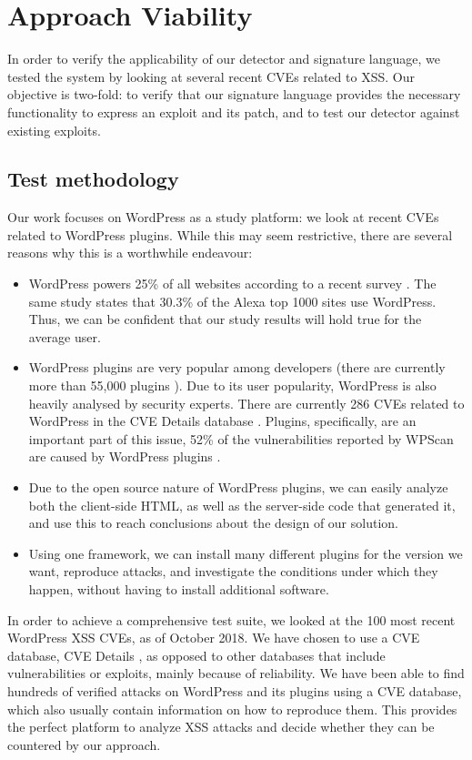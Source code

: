 \section{Approach Viability}

In order to verify the applicability of our detector and signature language, we tested the system by looking at several recent CVEs related to XSS. Our objective is two-fold: to verify that our signature language provides the necessary functionality to express an exploit and its patch, and to test our detector against existing exploits.

\subsection{Test methodology}

Our work focuses on WordPress as a study platform: we look at recent CVEs related to WordPress plugins. While this may seem restrictive, there are several reasons why this is a worthwhile endeavour:
\begin{itemize}
	\item WordPress powers 25\% of all websites according to a recent survey  \cite{w3techs}. The same study states that 30.3\% of the Alexa top 1000 sites use WordPress. Thus, we can be confident that our study results will hold true for the average user.
	\item WordPress plugins are very popular among developers (there are currently more than 55,000 plugins \cite{wpplugins}). Due to its user popularity, WordPress is also heavily analysed by security experts. There are currently 286 CVEs related to WordPress in the CVE Details database \cite{cvedetails}. Plugins, specifically, are an important part of this issue, 52\% of the vulnerabilities reported by WPScan are caused by WordPress plugins \cite{wpscan}.
	\item Due to the open source nature of WordPress plugins, we can easily analyze both the client-side HTML, as well as the server-side code that generated it, and use this to reach conclusions about the design of our solution.
	\item Using one framework, we can install many different plugins for the version we want, reproduce attacks, and investigate the conditions under which they happen, without having to install additional software.
\end{itemize}

In order to achieve a comprehensive test suite, we looked at the 100 most recent WordPress XSS CVEs, as of October 2018. We have chosen to use a CVE database, CVE Details \cite{cvedetails}, as opposed to other databases that include vulnerabilities or exploits, mainly because of reliability. We have been able to find hundreds of verified attacks on WordPress and its plugins using a CVE database, which also usually contain information on how to reproduce them. This provides the perfect platform to analyze XSS attacks and decide whether they can be countered by our approach. 

